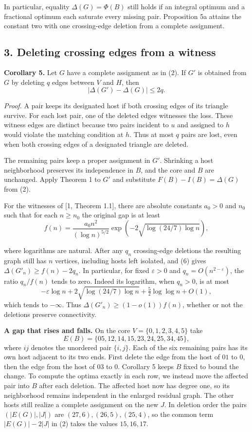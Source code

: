 \documentclass[english,11pt,a4paper]{article}
\begin{document}
In particular, equality \(\Delta(G)=\Phi(B)\) still holds if an integral optimum and a fractional optimum each saturate every missing pair. Proposition 5a attains the constant two with one crossing-edge deletion from a complete assignment.

\subsection{3. Deleting crossing edges from a witness}\label{deleting-crossing-edges-from-a-witness}

\textbf{Corollary 5.} Let \(G\) have a complete assignment as in (2). If \(G'\) is obtained from \(G\) by deleting \(q\) edges between \(V\) and \(H\), then
\[
|\Delta(G')-\Delta(G)|\le 2q. \tag{6}
\]

\emph{Proof.} A pair keeps its designated host if both crossing edges of its triangle survive. For each lost pair, one of the deleted edges witnesses the loss. These witness edges are distinct because two pairs incident to \(u\) and assigned to \(h\) would violate the matching condition at \(h\). Thus at most \(q\) pairs are lost, even when both crossing edges of a designated triangle are deleted.

The remaining pairs keep a proper assignment in \(G'\). Shrinking a host neighborhood preserves its independence in \(B\), and the core and \(B\) are unchanged. Apply Theorem 1 to \(G'\) and substitute \(F(B)-I(B)=\Delta(G)\) from (2).

For the witnesses of {[}1, Theorem 1.1{]}, there are absolute constants \(a_0>0\) and \(n_0\) such that for each \(n\ge n_0\) the original gap is at least
\[
f(n)=\frac{a_0 n^2}{(\log n)^{5/2}}
      \exp\!\left(-2\sqrt{\log(24/7)\log n}\right),
\]

where logarithms are natural. After any \(q_n\) crossing-edge deletions the resulting graph still has \(n\) vertices, including hosts left isolated, and (6) gives \(\Delta(G'_n)\ge f(n)-2q_n\). In particular, for fixed \(\varepsilon>0\) and \(q_n=O(n^{2-\varepsilon})\), the ratio \(q_n/f(n)\) tends to zero. Indeed its logarithm, when \(q_n>0\), is at most \[
-\varepsilon\log n+2\sqrt{\log(24/7)\log n}+\tfrac52\log\log n+O(1),
\] which tends to \(-\infty\). Thus \(\Delta(G'_n)\ge(1-o(1))f(n)\), whether or not the deletions preserve connectivity.

\textbf{A gap that rises and falls.} On the core \(V=\{0,1,2,3,4,5\}\) take \[
E(B)=\{05,12,14,15,23,24,25,34,45\},
\] where \(ij\) denotes the unordered pair \(\{i,j\}\). Each of the six remaining pairs has its own host adjacent to its two ends. First delete the edge from the host of \(01\) to \(0\), then the edge from the host of \(03\) to \(0\). Corollary 5 keeps \(B\) fixed to bound the change. To compute the optima exactly in each row, we instead move the affected pair into \(B\) after each deletion. The affected host now has degree one, so its neighborhood remains independent in the enlarged residual graph. The other hosts still realize a complete assignment on the new \(J\). In deletion order the pairs \((|E(G)|,|J|)\) are \((27,6),(26,5),(25,4)\), so the common term \(|E(G)|-2|J|\) in (2) takes the values \(15,16,17\).
\end{document}
